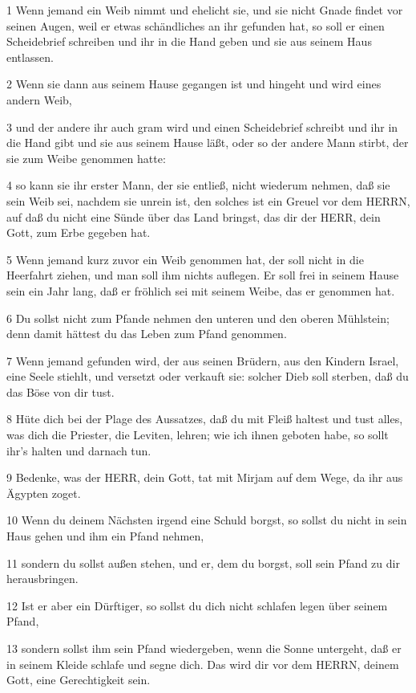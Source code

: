\par 1 Wenn jemand ein Weib nimmt und ehelicht sie, und sie nicht Gnade findet vor seinen Augen, weil er etwas schändliches an ihr gefunden hat, so soll er einen Scheidebrief schreiben und ihr in die Hand geben und sie aus seinem Haus entlassen.
\par 2 Wenn sie dann aus seinem Hause gegangen ist und hingeht und wird eines andern Weib,
\par 3 und der andere ihr auch gram wird und einen Scheidebrief schreibt und ihr in die Hand gibt und sie aus seinem Hause läßt, oder so der andere Mann stirbt, der sie zum Weibe genommen hatte:
\par 4 so kann sie ihr erster Mann, der sie entließ, nicht wiederum nehmen, daß sie sein Weib sei, nachdem sie unrein ist, den solches ist ein Greuel vor dem HERRN, auf daß du nicht eine Sünde über das Land bringst, das dir der HERR, dein Gott, zum Erbe gegeben hat.
\par 5 Wenn jemand kurz zuvor ein Weib genommen hat, der soll nicht in die Heerfahrt ziehen, und man soll ihm nichts auflegen. Er soll frei in seinem Hause sein ein Jahr lang, daß er fröhlich sei mit seinem Weibe, das er genommen hat.
\par 6 Du sollst nicht zum Pfande nehmen den unteren und den oberen Mühlstein; denn damit hättest du das Leben zum Pfand genommen.
\par 7 Wenn jemand gefunden wird, der aus seinen Brüdern, aus den Kindern Israel, eine Seele stiehlt, und versetzt oder verkauft sie: solcher Dieb soll sterben, daß du das Böse von dir tust.
\par 8 Hüte dich bei der Plage des Aussatzes, daß du mit Fleiß haltest und tust alles, was dich die Priester, die Leviten, lehren; wie ich ihnen geboten habe, so sollt ihr's halten und darnach tun.
\par 9 Bedenke, was der HERR, dein Gott, tat mit Mirjam auf dem Wege, da ihr aus Ägypten zoget.
\par 10 Wenn du deinem Nächsten irgend eine Schuld borgst, so sollst du nicht in sein Haus gehen und ihm ein Pfand nehmen,
\par 11 sondern du sollst außen stehen, und er, dem du borgst, soll sein Pfand zu dir herausbringen.
\par 12 Ist er aber ein Dürftiger, so sollst du dich nicht schlafen legen über seinem Pfand,
\par 13 sondern sollst ihm sein Pfand wiedergeben, wenn die Sonne untergeht, daß er in seinem Kleide schlafe und segne dich. Das wird dir vor dem HERRN, deinem Gott, eine Gerechtigkeit sein.
